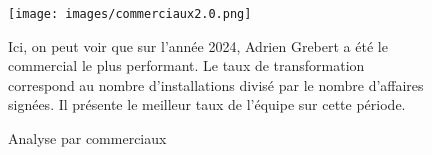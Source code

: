 \begin{figure}[H]
    \centering
    \texttt{[image: images/commerciaux2.0.png]}
    \caption{Analyse par commerciaux}\vspace{0.5em}

    \vspace{0.5em}
            {\small
           Ici, on peut voir que sur l’année 2024, Adrien Grebert a été le commercial le plus performant.
           Le taux de transformation correspond au nombre d’installations divisé par le nombre d’affaires signées.
           Il présente le meilleur taux de l’équipe sur cette période.

            }
\end{figure}


